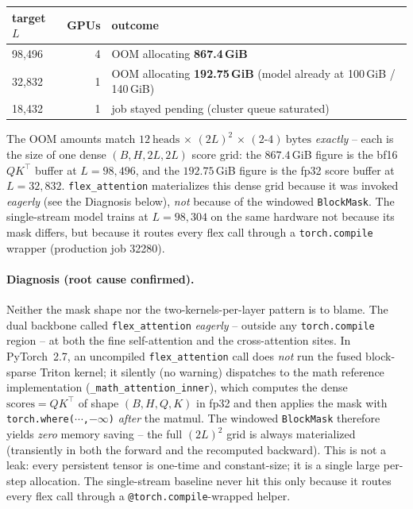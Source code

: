\documentclass[11pt,a4paper]{article}
\begin{document}
\begin{table}[h]
\centering
\begin{tabular}{l r l}
\toprule
target \(L\) & GPUs & outcome \\
\midrule
98{,}496 & 4 & OOM allocating \textbf{867.4\,GiB} \\
32{,}832 & 1 & OOM allocating \textbf{192.75\,GiB} (model already at 100\,GiB / 140\,GiB) \\
18{,}432 & 1 & job stayed pending (cluster queue saturated) \\
\bottomrule
\end{tabular}
\end{table}

\noindent The OOM amounts match
\(12\ \text{heads}\,\times\,(2L)^2\,\times\,(2\text{-}4)\ \text{bytes}\)
\emph{exactly} -- each is the size of one dense \((B,H,2L,2L)\) score grid: the
\(867.4\)\,GiB figure is the bf16 \(QK^\top\) buffer at \(L=98{,}496\), and the
\(192.75\)\,GiB figure is the fp32 score buffer at \(L=32{,}832\).
\texttt{flex\_attention} materializes this dense grid because it was invoked
\emph{eagerly} (see the Diagnosis below), \emph{not} because of the windowed
\texttt{BlockMask}. The single-stream model trains at \(L=98{,}304\) on the same
hardware not because its mask differs, but because it routes every flex call
through a \texttt{torch.compile} wrapper (production job 32280).

\paragraph{Diagnosis (root cause confirmed).}
Neither the mask shape nor the two-kernels-per-layer pattern is to blame. The
dual backbone called \texttt{flex\_attention} \emph{eagerly} -- outside any
\texttt{torch.compile} region -- at both the fine self-attention and the
cross-attention sites. In PyTorch~2.7, an uncompiled \texttt{flex\_attention}
call does \emph{not} run the fused block-sparse Triton kernel; it silently (no
warning) dispatches to the math reference implementation
(\texttt{\_math\_attention\_inner}), which computes the dense
\(\text{scores}=QK^\top\) of shape \((B,H,Q,K)\) in fp32 and then applies the
mask with \texttt{torch.where(\(\cdots\),\(-\infty\))} \emph{after} the matmul.
The windowed \texttt{BlockMask} therefore yields \emph{zero} memory saving --
the full \((2L)^2\) grid is always materialized (transiently in both the forward
and the recomputed backward). This is not a leak: every persistent tensor is
one-time and constant-size; it is a single large per-step allocation. The
single-stream baseline never hit this only because it routes every flex call
through a \texttt{@torch.compile}-wrapped helper.
\end{document}
